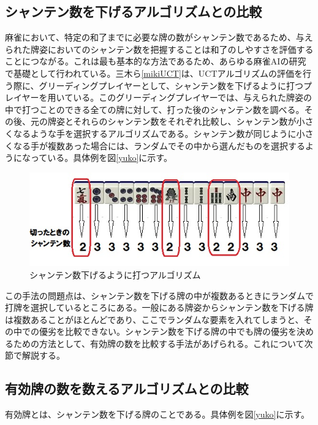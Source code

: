 \subsection{シャンテン数を下げるアルゴリズムとの比較}
麻雀において、特定の和了までに必要な牌の数がシャンテン数であるため、与えられた牌姿においてのシャンテン数を把握することは和了のしやすさを評価することにつながる。これは最も基本的な方法であるため、あらゆる麻雀AIの研究で基礎として行われている。三木ら\ref{mikiUCT}は、UCTアルゴリズムの評価を行う際に、グリーディングプレイヤーとして、シャンテン数を下げるように打つプレイヤーを用いている。このグリーディングプレイヤーでは、与えられた牌姿の中で打つことのできる全ての牌に対して、打った後のシャンテン数を調べる。その後、元の牌姿とそれらのシャンテン数をそれぞれ比較し、シャンテン数が小さくなるような手を選択するアルゴリズムである。シャンテン数が同じように小さくなる手が複数あった場合には、ランダムでその中から選んだものを選択するようになっている。具体例を図\ref{yuko}に示す。

\begin{figure}[h]
 \centering
 \includegraphics[keepaspectratio, scale=1,bb=0 0 539 194]
      {img/syanten.jpg}
 \caption{シャンテン数下げるように打つアルゴリズム}
 \label{syanten}
\end{figure}

この手法の問題点は、シャンテン数を下げる牌の中が複数あるときにランダムで打牌を選択しているところにある。一般にある牌姿からシャンテン数を下げる牌は複数あることがほとんどであり、ここでランダムな要素を入れてしまうと、その中での優劣を比較できない。シャンテン数を下げる牌の中でも牌の優劣を決めるための方法として、有効牌の数を比較する手法があげられる。これについて次節で解説する。


\subsection{有効牌の数を数えるアルゴリズムとの比較}
有効牌とは、シャンテン数を下げる牌のことである。具体例を図\ref{yuko}に示す。

